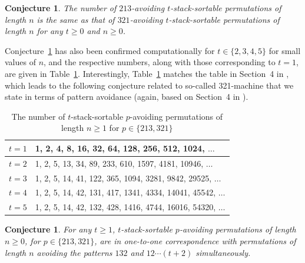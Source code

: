 \documentclass[11pt]{article}
\newtheorem{conj}[thm]{Conjecture}
\newcommand{\+}{\mbox{\ensuremath{\scriptstyle{+}}}}
\begin{document}
\begin{conj}\label{213-321-conj} The number of $213$-avoiding $t$-stack-sortable permutations of length $n$ is the same as that of $321$-avoiding  $t$-stack-sortable permutations of length $n$ for any $t\geq 0$ and $n\geq 0$.  \end{conj}

Conjecture~\ref{213-321-conj} has also been confirmed computationally for  $t\in\{2,3,4,5\}$ for small values of $n$, and the respective numbers, along with those corresponding to $t=1$, are given in Table~\ref{table-comput-res}. Interestingly, Table~\ref{table-comput-res} matches the table in Section~4 in \cite{Cerbai2020Stack}, which leads to the following conjecture related to so-called 321-machine that we state in terms of pattern avoidance (again, based on  Section~4 in \cite{Cerbai2020Stack}).

\begin{table}
	\begin{center}
		\begin{tabular}{|c|l|}
			\hline
			$t=1$ & 1, 2, 4, 8, 16, 32, 64, 128, 256, 512, 1024, $\ldots$         \\
			\hline
			$t=2$ & 1, 2, 5, 13, 34, 89, 233, 610, 1597, 4181, 10946, $\ldots$    \\
			\hline
			$t=3$ & 1, 2, 5, 14, 41, 122, 365, 1094, 3281, 9842, 29525, $\ldots$  \\
			\hline
			$t=4$ & 1, 2, 5, 14, 42, 131, 417, 1341, 4334, 14041, 45542, $\ldots$ \\
			\hline
			$t=5$ & 1, 2, 5, 14, 42, 132, 428, 1416, 4744, 16016, 54320, $\ldots$ \\
			\hline
		\end{tabular}
		\caption{The number of $t$-stack-sortable $p$-avoiding permutations of length $n\geq 1$ for $p\in\{213, 321\}$}\label{table-comput-res}
	\end{center}
\end{table}

\begin{conj}\label{conj2} For any $t\geq 1$, $t$-stack-sortable $p$-avoiding permutations of length $n\geq 0$, for $p\in\{213, 321\}$, are in one-to-one correspondence with permutations of length $n$ avoiding the patterns $132$ and $12\cdots (t+2)$ simultaneously. \end{conj}
\end{document}
